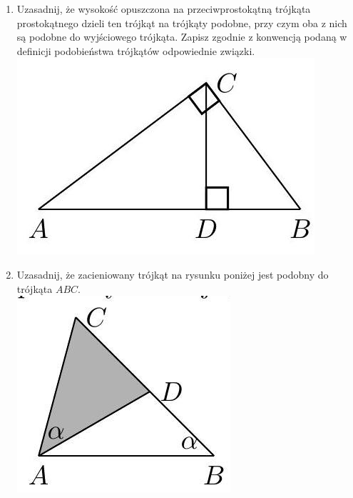 \documentclass[10pt]{article}
\begin{document}
\begin{enumerate}
  \item Uzasadnij, że wysokość opuszczona na przeciwprostokątną trójkąta prostokątnego dzieli ten trójkąt na trójkąty podobne, przy czym oba z nich są podobne do wyjściowego trójkąta. Zapisz zgodnie z konwencją podaną w definicji podobieństwa trójkątów odpowiednie związki.\\
\includegraphics[max width=\textwidth, center]{2024_11_21_e9b4faa005d5be2cc318g-021(1)}
  \item Uzasadnij, że zacieniowany trójkąt na rysunku poniżej jest podobny do trójkąta \(A B C\).\\
\includegraphics[max width=\textwidth, center]{2024_11_21_e9b4faa005d5be2cc318g-021(2)}

\end{enumerate}
\end{document}
